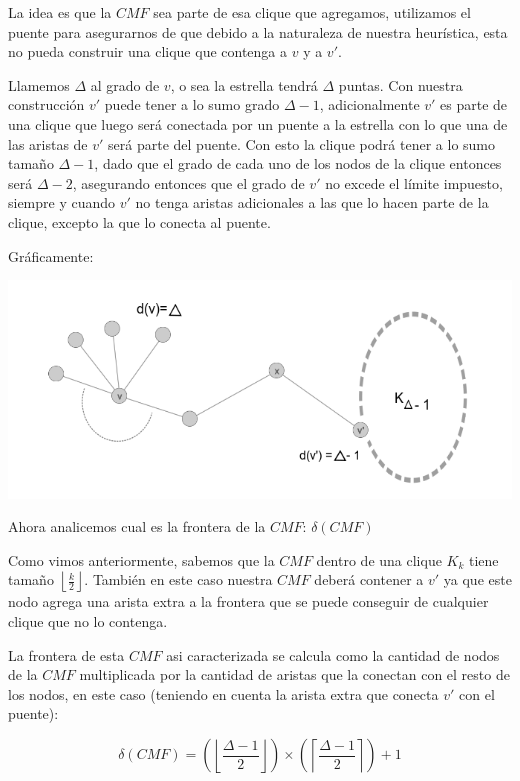 La idea es que la $CMF$ sea parte de esa clique que agregamos, utilizamos el puente para asegurarnos
de que debido a la naturaleza de nuestra heur\'istica, esta no pueda construir una clique que contenga
a $v$ y a $v'$.

Llamemos $\Delta$ al grado de $v$, o sea la estrella tendr\'a $\Delta$ puntas. Con nuestra construcci\'on 
$v'$ puede tener a lo sumo grado $\Delta -1$, adicionalmente $v'$ es parte de una clique que luego ser\'a 
conectada por un puente a la estrella con lo que una de las aristas de $v'$ ser\'a parte del puente. 
Con esto la clique podr\'a tener a lo sumo tama\~no $\Delta -1$, dado que el grado de cada uno de los 
nodos de la clique entonces ser\'a $\Delta -2$, asegurando entonces que el grado de $v'$ no excede
el l\'imite impuesto, siempre y cuando $v'$ no tenga aristas adicionales a las que lo hacen 
parte de la clique, excepto la que lo conecta al puente.

Gr\'aficamente:
\begin{center} 
	\includegraphics[scale = 0.6]{img/ej3/constructiva_golosa/vnotincmf_carac1.png} 
\end{center}

Ahora analicemos cual es la frontera de la $CMF$: $\delta (CMF)$

Como vimos anteriormente, sabemos que la $CMF$ dentro de una clique $K_k$ tiene tama\~no
$\left\lfloor \frac{k}{2} \right \rfloor$. Tambi\'en en este caso nuestra $CMF$ deber\'a
contener a $v'$ ya que este nodo agrega una arista extra a la frontera que se puede conseguir
de cualquier clique que no lo contenga.

La frontera de esta $CMF$ asi caracterizada se calcula como la cantidad de nodos de la $CMF$
multiplicada por la cantidad de aristas que la conectan con el resto de los nodos, en este caso
(teniendo en cuenta la arista extra que conecta $v'$ con el puente):

\[ \delta(CMF) = (\left\lfloor \frac{\Delta -1}{2} \right\rfloor) \times 
	(\left\lceil \frac{\Delta -1}{2} \right\rceil) + 1 \]

